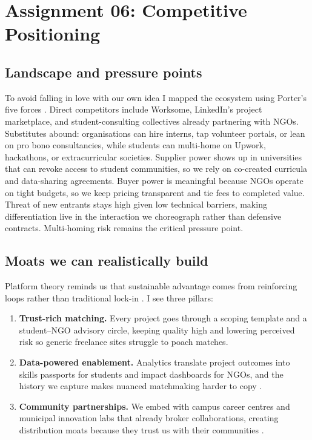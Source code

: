 \section*{Assignment 06: Competitive Positioning}

\subsection*{Landscape and pressure points}
To avoid falling in love with our own idea I mapped the ecosystem using Porter’s five forces \citep{Porter2008}. Direct competitors include Worksome, LinkedIn’s project marketplace, and student-consulting collectives already partnering with NGOs. Substitutes abound: organisations can hire interns, tap volunteer portals, or lean on pro bono consultancies, while students can multi-home on Upwork, hackathons, or extracurricular societies. Supplier power shows up in universities that can revoke access to student communities, so we rely on co-created curricula and data-sharing agreements. Buyer power is meaningful because NGOs operate on tight budgets, so we keep pricing transparent and tie fees to completed value. Threat of new entrants stays high given low technical barriers, making differentiation live in the interaction we choreograph rather than defensive contracts. Multi-homing risk remains the critical pressure point.

\subsection*{Moats we can realistically build}
Platform theory reminds us that sustainable advantage comes from reinforcing loops rather than traditional lock-in \citep{Choudary2016,Reillier2017,Lecture07}. I see three pillars:
\begin{enumerate}
  \item \textbf{Trust-rich matching.} Every project goes through a scoping template and a student--NGO advisory circle, keeping quality high and lowering perceived risk so generic freelance sites struggle to poach matches.
  \item \textbf{Data-powered enablement.} Analytics translate project outcomes into skills passports for students and impact dashboards for NGOs, and the history we capture makes nuanced matchmaking harder to copy \citep{FarrellSaloner1986}.
  \item \textbf{Community partnerships.} We embed with campus career centres and municipal innovation labs that already broker collaborations, creating distribution moats because they trust us with their communities \citep{ShapiroVarian1999}.
\end{enumerate}

